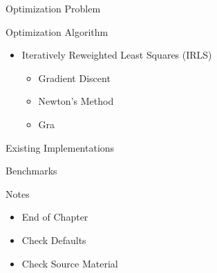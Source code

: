 \documentclass[10pt]{beamer}
\begin{document}
\begin{frame}{Optimization Problem}
  
\end{frame}

\begin{frame}{Optimization Algorithm}
  \begin{itemize}
  \item Iteratively Reweighted Least Squares (IRLS)
  \begin{itemize}
  \item Gradient Discent
  \item Newton's Method
  \item Gra
  \end{itemize}
  \end{itemize}
  
\end{frame}

\begin{frame}{Existing Implementations}
\end{frame}

\begin{frame}{Benchmarks}
\end{frame}

\begin{frame}{Notes}
  \begin{itemize}
  \item End of Chapter
  \item Check Defaults
  \item Check Source Material
  \end{itemize}
\end{frame}

\begin{frame}{}
\end{frame}

\begin{frame}{}
\end{frame}
\end{document}

